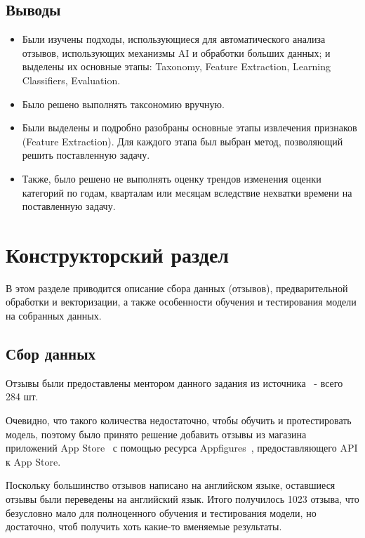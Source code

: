 \documentclass[a4paper,12pt]{article}
\begin{document}
	
	
	\subsection*{Выводы}
	
	\begin{itemize}
		\item Были изучены подходы, использующиеся для автоматического анализа отзывов, использующих механизмы AI и обработки больших данных; и выделены их основные этапы: Taxonomy, Feature Extraction, Learning Classifiers, Evaluation.
		
		\item Было решено выполнять таксономию вручную.
		
		\item Были выделены и подробно разобраны основные этапы извлечения признаков (Feature Extraction). Для каждого этапа был выбран метод, позволяющий решить поставленную задачу.
		
		\item Также, было решено не выполнять оценку трендов изменения оценки категорий по годам, кварталам или месяцам вследствие нехватки времени на поставленную задачу.
	\end{itemize}
	
	\section{Конструкторский раздел}
	
	В этом разделе приводится описание сбора данных (отзывов), предварительной обработки и векторизации, а также особенности обучения и тестирования модели на собранных данных.
	
	\subsection{Сбор данных}
	
	Отзывы были предоставлены ментором данного задания из источника~\cite{parallels} - всего 284 шт.
	
	Очевидно, что такого количества недостаточно, чтобы обучить и протестировать модель, поэтому было принято решение добавить отзывы из магазина приложений App Store~\cite{appstore} с помощью ресурса Appfigures~\cite{appfigures}, предоставляющего API к App Store.
	
	Поскольку большинство отзывов написано на английском языке, оставшиеся отзывы были переведены на английский язык. Итого получилось 1023 отзыва, что безусловно мало для полноценного обучения и тестирования модели, но достаточно, чтоб получить хоть какие-то вменяемые результаты.
	
\end{document}
